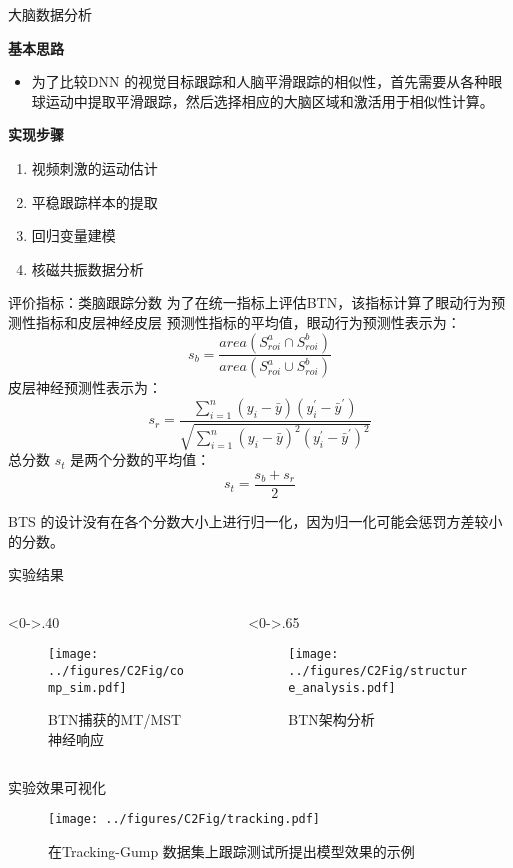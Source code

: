 \begin{frame}{大脑数据分析}
	\begin{block}{\textbf{基本思路}}
		\begin{itemize}
			\item<0-> 为了比较DNN 的视觉目标跟踪和人脑平滑跟踪的相似性，首先需要从各种眼球运动中提取平滑跟踪，然后选择相应的大脑区域和激活用于相似性计算。
		\end{itemize}
	\end{block}
	
	\begin{block}{\textbf{实现步骤}}
		\begin{enumerate}
			\item<0-> 视频刺激的运动估计
			\item<0-> 平稳跟踪样本的提取
			\item<0-> 回归变量建模
			\item<0-> 核磁共振数据分析
		\end{enumerate}
	\end{block}
\end{frame}


\begin{frame}{评价指标：类脑跟踪分数}
	为了在统一指标上评估BTN，该指标计算了眼动行为预测性指标和皮层神经皮层
	预测性指标的平均值，眼动行为预测性表示为：
	\[  s_b=\frac{area(S_{roi}^a \cap S_{roi}^b) }  { area(S_{roi}^a \cup S_{roi}^b) }   \]
	皮层神经预测性表示为：
	\[  s_r=\frac{\sum_{i=1}^{n} (y_i-\bar{y}) (y_i^\prime - \bar{y}^\prime) }{\sqrt{\sum_{i=1}^{n} (y_i - \bar{y})^2 (y_i^\prime - \bar{y}^\prime)^2 }}  \]
	总分数 $s_{t}$ 是两个分数的平均值：
	\[  s_{t} = \frac{s_b + s_r}{2}  \]
	\begin{center}
		\textcolor{mymauve}{BTS 的设计没有在各个分数大小上进行归一化，因为归一化可能会惩罚方差较小的分数。}
	\end{center}
\end{frame}


\begin{frame}{实验结果}
	\begin{columns}[T] %
		\begin{column}<0->{.40\textwidth}
			\begin{figure}[!t]
				\centering
				\texttt{[image: ../figures/C2Fig/comp\_sim.pdf]}
				\caption{BTN捕获的MT/MST神经响应}
			\end{figure}
		\end{column}
		\hfill%
		
		\begin{column}<0->{.65\textwidth}
			\begin{figure}[!t]
				\centering
				\texttt{[image: ../figures/C2Fig/structure\_analysis.pdf]}
				\caption{BTN架构分析}
			\end{figure}
		\end{column}%
	\end{columns}
	
\end{frame}

\begin{frame}{实验效果可视化}
	\begin{figure}[!t]
		\centering
		\texttt{[image: ../figures/C2Fig/tracking.pdf]}
		\caption{在Tracking-Gump 数据集上跟踪测试所提出模型效果的示例}
	\end{figure}
\end{frame}
